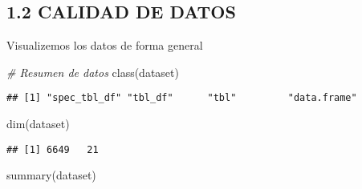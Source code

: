 \documentclass[
]{article}
\newenvironment{Shaded}{\begin{snugshade}}{\end{snugshade}}
\newcommand{\CommentTok}[1]{\textcolor[rgb]{0.56,0.35,0.01}{\textit{#1}}}
\newcommand{\FunctionTok}[1]{\textcolor[rgb]{0.00,0.00,0.00}{#1}}
\newcommand{\NormalTok}[1]{#1}
\begin{document}
\hypertarget{calidad-de-datos}{%
\subsection{1.2 CALIDAD DE DATOS}\label{calidad-de-datos}}

Visualizemos los datos de forma general

\begin{Shaded}
\begin{Highlighting}[]
\CommentTok{\# Resumen de datos}
\FunctionTok{class}\NormalTok{(dataset)}
\end{Highlighting}
\end{Shaded}

\begin{verbatim}
## [1] "spec_tbl_df" "tbl_df"      "tbl"         "data.frame"
\end{verbatim}

\begin{Shaded}
\begin{Highlighting}[]
\FunctionTok{dim}\NormalTok{(dataset)}
\end{Highlighting}
\end{Shaded}

\begin{verbatim}
## [1] 6649   21
\end{verbatim}

\begin{Shaded}
\begin{Highlighting}[]
\FunctionTok{summary}\NormalTok{(dataset)}
\end{Highlighting}
\end{Shaded}
\end{document}
